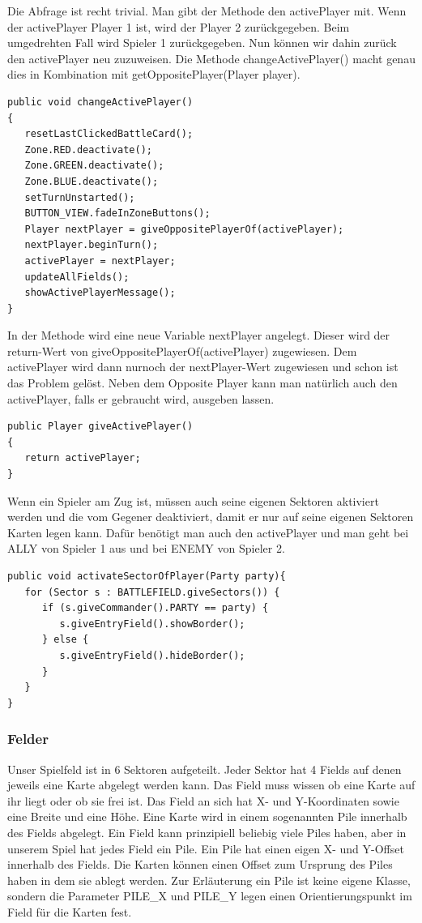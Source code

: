 Die Abfrage ist recht trivial. Man gibt der Methode den activePlayer mit. Wenn der activePlayer Player 1 ist, wird der Player 2 zurückgegeben. Beim umgedrehten Fall wird Spieler 1 zurückgegeben. Nun können wir dahin zurück den activePlayer neu zuzuweisen. Die Methode changeActivePlayer() macht genau dies in Kombination mit getOppositePlayer(Player player).

\begin{lstlisting}
public void changeActivePlayer()
{
   resetLastClickedBattleCard();
   Zone.RED.deactivate();
   Zone.GREEN.deactivate();
   Zone.BLUE.deactivate();
   setTurnUnstarted();
   BUTTON_VIEW.fadeInZoneButtons();
   Player nextPlayer = giveOppositePlayerOf(activePlayer);
   nextPlayer.beginTurn();
   activePlayer = nextPlayer;
   updateAllFields();
   showActivePlayerMessage();
}
\end{lstlisting}

In der Methode wird eine neue Variable nextPlayer angelegt. Dieser wird der return-Wert von giveOppositePlayerOf(activePlayer) zugewiesen. Dem activePlayer wird dann nurnoch der nextPlayer-Wert zugewiesen und schon ist das Problem gelöst.
Neben dem Opposite Player kann man natürlich auch den activePlayer, falls er gebraucht wird, ausgeben lassen.

\begin{lstlisting}
public Player giveActivePlayer()
{
   return activePlayer;
}
\end{lstlisting}

Wenn ein Spieler am Zug ist, müssen auch seine eigenen Sektoren aktiviert werden und die vom Gegener deaktiviert, damit er nur auf seine eigenen Sektoren Karten legen kann. Dafür benötigt man auch den activePlayer und man geht bei ALLY von Spieler 1 aus und bei ENEMY von Spieler 2.

\begin{lstlisting}
public void activateSectorOfPlayer(Party party){
   for (Sector s : BATTLEFIELD.giveSectors()) {
      if (s.giveCommander().PARTY == party) {
         s.giveEntryField().showBorder();
      } else {
         s.giveEntryField().hideBorder();
      }
   }
}
\end{lstlisting}

\subsubsection{Felder}
Unser Spielfeld ist in 6 Sektoren aufgeteilt. Jeder Sektor hat 4 Fields auf denen jeweils eine Karte abgelegt werden kann. Das Field muss wissen ob eine Karte auf ihr liegt oder ob sie frei ist. Das Field an sich hat X- und Y-Koordinaten sowie eine Breite und eine Höhe. Eine Karte wird in einem sogenannten Pile innerhalb des Fields abgelegt. Ein Field kann prinzipiell beliebig viele Piles haben, aber in unserem Spiel hat jedes Field ein Pile. Ein Pile hat einen eigen X- und Y-Offset innerhalb des Fields. Die Karten können einen Offset zum Ursprung des Piles haben in dem sie ablegt werden.
Zur Erläuterung ein Pile ist keine eigene Klasse, sondern die Parameter PILE\_X und PILE\_Y legen
einen Orientierungspunkt im Field für die Karten fest.

